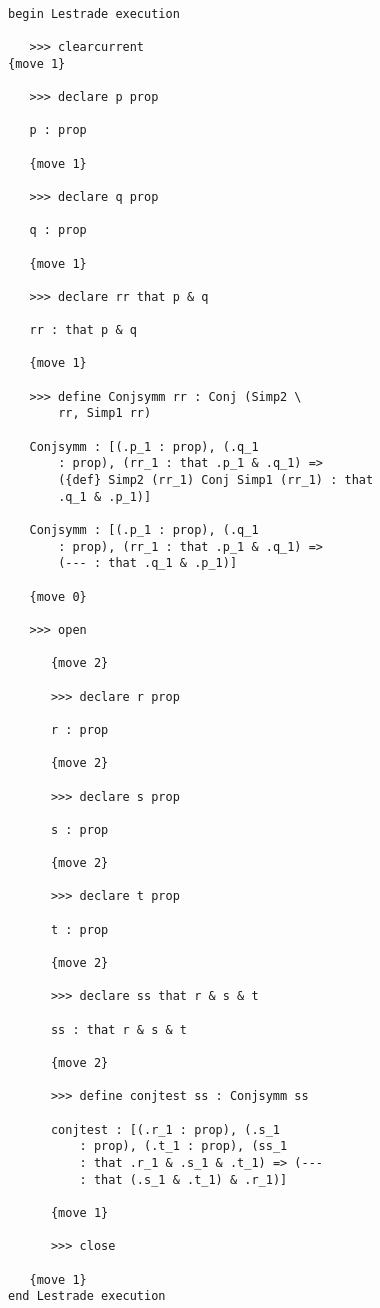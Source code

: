 \documentclass[12pt]{article}
\begin{document}
\begin{verbatim}

begin Lestrade execution

   >>> clearcurrent
{move 1}

   >>> declare p prop

   p : prop

   {move 1}

   >>> declare q prop

   q : prop

   {move 1}

   >>> declare rr that p & q

   rr : that p & q

   {move 1}

   >>> define Conjsymm rr : Conj (Simp2 \
       rr, Simp1 rr)

   Conjsymm : [(.p_1 : prop), (.q_1 
       : prop), (rr_1 : that .p_1 & .q_1) => 
       ({def} Simp2 (rr_1) Conj Simp1 (rr_1) : that 
       .q_1 & .p_1)]

   Conjsymm : [(.p_1 : prop), (.q_1 
       : prop), (rr_1 : that .p_1 & .q_1) => 
       (--- : that .q_1 & .p_1)]

   {move 0}

   >>> open

      {move 2}

      >>> declare r prop

      r : prop

      {move 2}

      >>> declare s prop

      s : prop

      {move 2}

      >>> declare t prop

      t : prop

      {move 2}

      >>> declare ss that r & s & t

      ss : that r & s & t

      {move 2}

      >>> define conjtest ss : Conjsymm ss

      conjtest : [(.r_1 : prop), (.s_1 
          : prop), (.t_1 : prop), (ss_1 
          : that .r_1 & .s_1 & .t_1) => (--- 
          : that (.s_1 & .t_1) & .r_1)]

      {move 1}

      >>> close

   {move 1}
end Lestrade execution
\end{verbatim}
\end{document}
